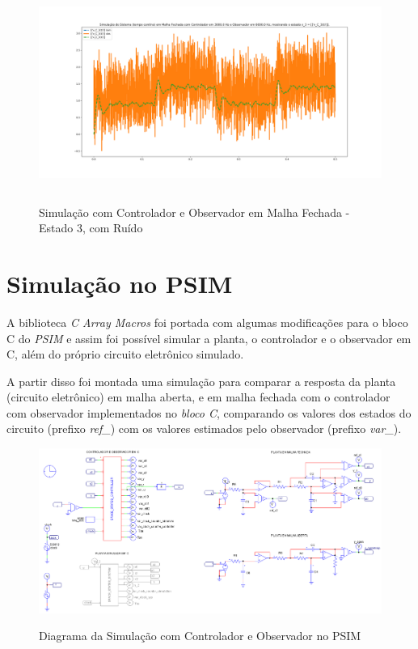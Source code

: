 \documentclass[
	12pt,				%
	article,			%
	openright,			%
	oneside,
	a4paper,			%
	chapter=TITLE,		%
	section=TITLE,		%
	english,			%
	french,				%
	spanish,			%
	brazil,				%
]{abntex2}
\begin{document}
\begin{apendicesenv}
        	\begin{figure}[htbp]
            	\centering
            	\caption{Simulação com Controlador e Observador em Malha Fechada - Estado 3, com Ruído}
            	\includegraphics[width=\textwidth,height=240px,keepaspectratio]{imgs/step_response_closedloop_observer_state3_noise.png}
            	\label{fig-step_response_closedloop_observer_state3_noise}
        	\end{figure}
        	
        	\FloatBarrier
        	
        \clearpage
        \chapter{Simulação no PSIM}
        \label{ap-psim}
        
            A biblioteca \textit{C Array Macros} foi portada com algumas modificações para o bloco C do \textit{PSIM} e assim foi possível simular a planta, o controlador e o observador em C, além do próprio circuito eletrônico simulado.
            
            A partir disso foi montada uma simulação para comparar a resposta da planta (circuito eletrônico) em malha aberta, e em malha fechada com o controlador com observador implementados no \textit{bloco C}, comparando os valores dos estados do circuito (prefixo \textit{ref\_}) com os valores estimados pelo observador (prefixo \textit{var\_}).
            
            \begin{figure}
            	\centering
            	\caption{Diagrama da Simulação com Controlador e Observador no PSIM}
            	\includegraphics[width=\textwidth,keepaspectratio]{tex/imgs/psim/diagram.png}
            	\label{fig-psim_diagram}
        	\end{figure}
            

\end{apendicesenv}
\end{document}
